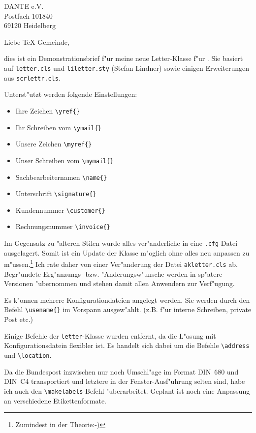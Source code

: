 \documentclass[%
foldmarks,
bankhigh,
banklow,
draft,
refdate,
twoside,
a4paper]
{akletter}
\begin{document}
\begin{letter}{DANTE e.V.\\Postfach 101840\\69120 Heidelberg}
\telephone{}
\signature{}
\subject{LaTeX2e Letter-class}
\opening{Liebe \TeX-Gemeinde,}
%
dies ist ein Demonstrationsbrief f"ur meine neue Letter-Klasse 
f"ur \LaTeXe. Sie basiert auf \texttt{letter.cls} und 
\texttt{liletter.sty} (Stefan Lindner) sowie einigen 
Erweiterungen aus \texttt{scrlettr.cls}.

Unterst"utzt werden folgende Einstellungen:

\begin{itemize}
\item Ihre Zeichen \verb|\yref{}|
\item Ihr Schreiben vom \verb|\ymail{}|
\item Unsere Zeichen \verb|\myref{}|
\item Unser Schreiben vom \verb|\mymail{}|
\item Sachbearbeiternamen \verb|\name{}|
\item Unterschrift \verb|\signature{}|
\item Kundennummer \verb+\customer{}+
\item Rechnungsnummer \verb+\invoice{}+
\end{itemize}

Im Gegensatz zu "alteren Stilen wurde alles ver"anderliche in eine 
\verb|.cfg|-Datei ausgelagert. Somit ist ein Update der Klasse 
m"oglich ohne alles neu anpassen zu m"ussen.\footnote{Zumindest in 
der Theorie:-)} Ich rate daher von einer Ver"anderung der Datei 
\texttt{akletter.cls} ab. Begr"undete Erg"anzungs- bzw. 
"Anderungsw"unsche werden in sp"atere Versionen "ubernommen und 
stehen damit allen Anwendern zur Verf"ugung.

Es k"onnen mehrere Konfigurationdateien angelegt werden. Sie 
werden durch den Befehl \verb|\usename{}| im Vorspann 
ausgew"ahlt. (z.B. f"ur interne Schreiben, private Post etc.)

Einige Befehle der \verb|letter|-Klasse wurden entfernt, da die 
L"osung mit Konfigurationsdatein flexibler ist. Es handelt sich 
dabei um die Befehle \verb|\address| und \verb|\location|.

Da die Bundespost inzwischen nur noch Umschl"age im Format 
DIN~680 und DIN~C4 transportiert und letztere in der 
Fenster-Ausf"uhrung selten sind, habe ich auch den 
\verb|\makelabels|-Befehl "uberarbeitet. Geplant ist noch eine 
Anpassung an verschiedene Etikettenformate.


\end{letter}
\end{document}
